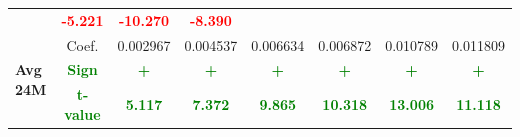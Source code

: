 \documentclass[11pt,english,a4paper,hidelinks]{book}
\begin{document}
\begin{table}[H]
\begin{tabular}{lccccccc}
                     & \textbf{\textcolor{red}{-5.221}}
                     & \textbf{\textcolor{red}{-10.270}}
                     & \textbf{\textcolor{red}{-8.390}} \\
        \cmidrule{1-8}
        \multirow{3}{*}{\textbf{Avg 24M}}
            & Coef.   & 0.002967  & 0.004537  & 0.006634  & 0.006872  & 0.010789  & 0.011809  \\
            & \textbf{\textcolor{green}{Sign}}
                     & \textbf{\textcolor{green}{+}}
                     & \textbf{\textcolor{green}{+}}
                     & \textbf{\textcolor{green}{+}}
                     & \textbf{\textcolor{green}{+}}
                     & \textbf{\textcolor{green}{+}}
                     & \textbf{\textcolor{green}{+}} \\
            & \textbf{\textcolor{green}{t-value}}
                     & \textbf{\textcolor{green}{5.117}}
                     & \textbf{\textcolor{green}{7.372}}
                     & \textbf{\textcolor{green}{9.865}}
                     & \textbf{\textcolor{green}{10.318}}
                     & \textbf{\textcolor{green}{13.006}}
                     & \textbf{\textcolor{green}{11.118}} \\
        \bottomrule
    \end{tabular}
    \label{tab:asia_oceania_growth_consistency}
\end{table}
\end{document}
